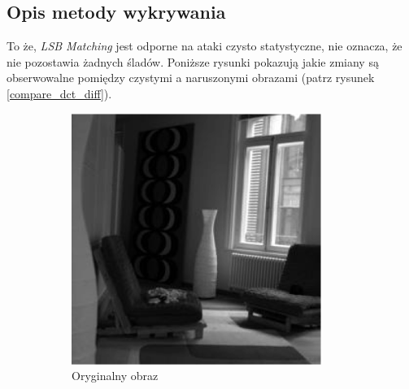     \subsection{Opis metody wykrywania}
        To że, \textit{LSB Matching} jest odporne na ataki czysto statystyczne, nie oznacza, że nie pozostawia żadnych śladów. Poniższe rysunki pokazują jakie zmiany są obserwowalne pomiędzy czystymi a naruszonymi obrazami (patrz rysunek \ref{compare_dct_diff}).

         \begin{figure}[h]
            \centering
            \begin{subfigure}{0.3\textwidth}
                \centering
                \includegraphics[width=\textwidth]{img/cover.png}
                \caption{Oryginalny obraz}
            \end{subfigure}
            \hfill
            \begin{subfigure}{0.3\textwidth}
                \centering

\end{subfigure}
\end{figure}
